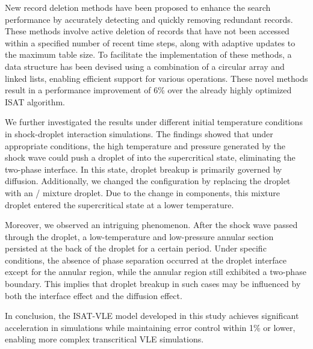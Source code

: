 New record deletion methods have been proposed to enhance the search performance by accurately detecting and quickly removing redundant records. These methods involve active deletion of records that have not been accessed within a specified number of recent time steps, along with adaptive updates to the maximum table size. To facilitate the implementation of these methods, a data structure has been devised using a combination of a circular array and linked lists, enabling efficient support for various operations. These novel methods result in a performance improvement of 6\% over the already highly optimized ISAT algorithm.

We further investigated the results under different initial temperature conditions in shock-droplet interaction simulations. The findings showed that under appropriate conditions, the high temperature and pressure generated by the shock wave could push a droplet of  into the supercritical state, eliminating the two-phase interface. In this state, droplet breakup is primarily governed by diffusion. Additionally, we changed the configuration by replacing the  droplet with an / mixture droplet. Due to the change in components, this mixture droplet entered the supercritical state at a lower temperature.

Moreover, we observed an intriguing phenomenon. After the shock wave passed through the droplet, a low-temperature and low-pressure annular section persisted at the back of the droplet for a certain period. Under specific conditions, the absence of phase separation occurred at the droplet interface except for the annular region, while the annular region still exhibited a two-phase boundary. This implies that droplet breakup in such cases may be influenced by both the interface effect and the diffusion effect.

In conclusion, the ISAT-VLE model developed in this study achieves significant acceleration in simulations while maintaining error control within 1\% or lower, enabling more complex transcritical VLE simulations.


